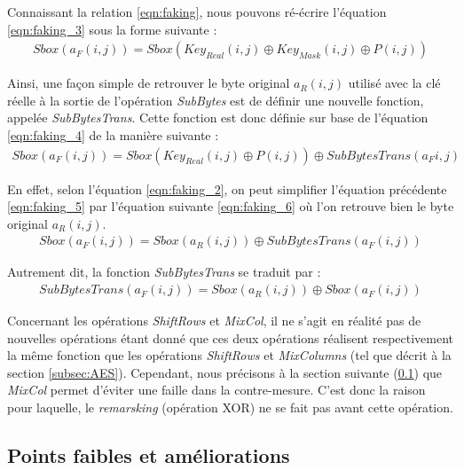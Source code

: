 \documentclass[oneside]{book}
\begin{document}
\hspace{-0.5cm}Connaissant la relation \ref{eqn:faking}, nous pouvons ré-écrire l'équation \ref{eqn:faking_3} sous la forme suivante : 
\begin{gather}
	Sbox(a_{F}(i,j)) = Sbox(Key_{Real}(i,j) \oplus Key_{Mask}(i,j) \oplus P(i,j))\label{eqn:faking_4}
\end{gather}

\hspace{-0.5cm}Ainsi, une façon simple de retrouver le byte original $a_{R}(i,j)$ utilisé avec la clé réelle à la sortie de l'opération \textit{SubBytes} est de définir une nouvelle fonction, appelée \textit{SubBytesTrans}. Cette fonction est donc définie sur base de l'équation \ref{eqn:faking_4} de la manière suivante : 
\begin{gather}
	Sbox(a_{F}(i,j)) = Sbox(Key_{Real}(i,j) \oplus P(i,j)) \oplus SubBytesTrans(a_{F}i,j)\label{eqn:faking_5}
\end{gather}

\hspace{-0.5cm}En effet, selon l'équation \ref{eqn:faking_2}, on peut simplifier l'équation précédente \ref{eqn:faking_5} par l'équation suivante \ref{eqn:faking_6} où l'on retrouve bien le byte original $a_{R}(i,j)$.
\begin{gather}
	Sbox(a_{F}(i,j)) = Sbox(a_{R}(i,j)) \oplus SubBytesTrans(a_{F}(i,j))\label{eqn:faking_6}
\end{gather}

\hspace{-0.5cm}Autrement dit, la fonction \textit{SubBytesTrans} se traduit par :
\begin{gather}
	SubBytesTrans(a_{F}(i,j)) = Sbox(a_{R}(i,j))  \oplus Sbox(a_{F}(i,j)) \label{eqn:faking_7}
\end{gather}

\hspace{-0.5cm}Concernant les opérations \textit{ShiftRows} et \textit{MixCol}, il ne s'agit en réalité pas de nouvelles opérations étant donné que ces deux opérations réalisent respectivement la même fonction que les opérations \textit{ShiftRows} et \textit{MixColumns} (tel que décrit à la section \ref{subsec:AES}). Cependant, nous précisons à la section suivante (\ref{subsec:points}) que \textit{MixCol} permet d'éviter une faille dans la contre-mesure. C'est donc la raison pour laquelle, le \textit{remarsking} (opération XOR) ne se fait pas avant cette opération.

\subsection{Points faibles et améliorations}
\label{subsec:points}
\end{document}
